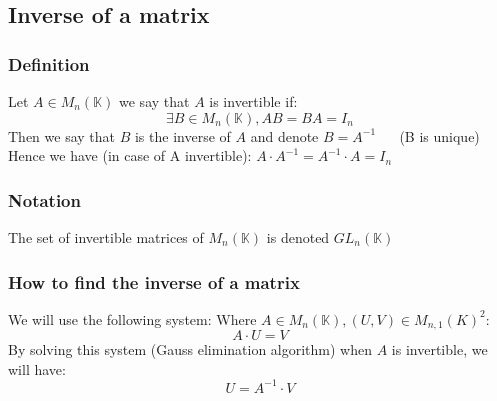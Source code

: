 \documentclass[notitlepage]{math}
\begin{document}
\subsection{Inverse of a matrix}
\subsubsection{Definition}
Let $A \in M_{n}(\mathbb{K})$ we say that $A$ is invertible if:
\[  \exists B \in M_{n}(\mathbb{K}), AB = BA = I_n \]
Then we say that $B$ is the inverse of $A$ and denote $B = A^{-1}$ $\quad$ (B is unique)
Hence we have (in case of A invertible): $A \cdot A^{-1} = A^{-1} \cdot A = I_n$
\subsubsection{Notation}
The set of invertible matrices of $M_{n}(\mathbb{K})$ is denoted $GL_n(\mathbb{K})$
\subsubsection{How to find the inverse of a matrix}
We will use the following system:
Where $A \in M_{n}(\mathbb{K}), (U,V) \in M_{n,1}(K)^2$:
\[A \cdot U = V  \]
By solving this system (Gauss elimination algorithm) when $A$ is invertible, we will have:
\[ U = A^{-1} \cdot V \]
\end{document}
